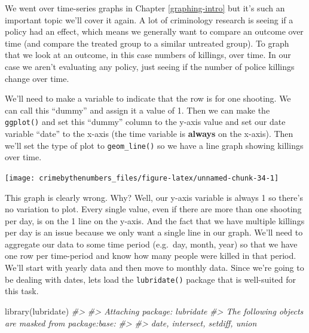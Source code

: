 \documentclass[
]{krantz}
\makeatletter
\newenvironment{Shaded}{\begin{snugshade}}{\end{snugshade}}
\newcommand{\AttributeTok}[1]{\textcolor[rgb]{0.61,0.61,0.61}{#1}}
\newcommand{\CommentTok}[1]{\textcolor[rgb]{0.37,0.37,0.37}{\textit{#1}}}
\newcommand{\DecValTok}[1]{\textcolor[rgb]{0.06,0.06,0.06}{#1}}
\newcommand{\FunctionTok}[1]{\textcolor[rgb]{0,0,0}{#1}}
\newcommand{\NormalTok}[1]{#1}
\newcommand{\OtherTok}[1]{\textcolor[rgb]{0.37,0.37,0.37}{#1}}
\newcommand{\SpecialCharTok}[1]{\textcolor[rgb]{0,0,0}{#1}}
\newenvironment{kframe}{%
\medskip{}
\setlength{\fboxsep}{.8em}
 \def\at@end@of@kframe{}%
 \ifinner\ifhmode%
  \def\at@end@of@kframe{\end{minipage}}%
  \begin{minipage}{\columnwidth}%
 \fi\fi%
 \def\FrameCommand##1{\hskip\@totalleftmargin \hskip-\fboxsep
 \colorbox{shadecolor}{##1}\hskip-\fboxsep
     \hskip-\linewidth \hskip-\@totalleftmargin \hskip\columnwidth}%
 \MakeFramed {\advance\hsize-\width
   \@totalleftmargin\z@ \linewidth\hsize
   \@setminipage}}%
 {\par\unskip\endMakeFramed%
 \at@end@of@kframe}
\renewenvironment{Shaded}{\begin{kframe}}{\end{kframe}}
\makeatother
\begin{document}
We went over time-series graphs in Chapter \ref{graphing-intro} but it's such an important topic we'll cover it again. A lot of criminology research is seeing if a policy had an effect, which means we generally want to compare an outcome over time (and compare the treated group to a similar untreated group). To graph that we look at an outcome, in this case numbers of killings, over time. In our case we aren't evaluating any policy, just seeing if the number of police killings change over time.

We'll need to make a variable to indicate that the row is for one shooting. We can call this ``dummy'' and assign it a value of 1. Then we can make the \texttt{ggplot()} and set this ``dummy'' column to the y-axis value and set our date variable ``date'' to the x-axis (the time variable is \textbf{always} on the x-axis). Then we'll set the type of plot to \texttt{geom\_line()} so we have a line graph showing killings over time.

\begin{Shaded}
\end{Shaded}

\begin{center}\texttt{[image: crimebythenumbers\_files/figure-latex/unnamed-chunk-34-1]} \end{center}

This graph is clearly wrong. Why? Well, our y-axis variable is always 1 so there's no variation to plot. Every single value, even if there are more than one shooting per day, is on the 1 line on the y-axis. And the fact that we have multiple killings per day is an issue because we only want a single line in our graph. We'll need to aggregate our data to some time period (e.g.~day, month, year) so that we have one row per time-period and know how many people were killed in that period. We'll start with yearly data and then move to monthly data. Since we're going to be dealing with dates, lets load the \texttt{lubridate()} package that is well-suited for this task.

\begin{Shaded}
\begin{Highlighting}[]
\FunctionTok{library}\NormalTok{(lubridate)}
\CommentTok{\#\textgreater{} }
\CommentTok{\#\textgreater{} Attaching package: \textquotesingle{}lubridate\textquotesingle{}}
\CommentTok{\#\textgreater{} The following objects are masked from \textquotesingle{}package:base\textquotesingle{}:}
\CommentTok{\#\textgreater{} }
\CommentTok{\#\textgreater{}     date, intersect, setdiff, union}
\end{Highlighting}
\end{Shaded}
\end{document}
